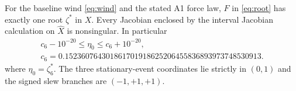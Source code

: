 \begin{theorem}\label{thm:root}
For the baseline wind \eqref{eq:wind} and the stated A1 force law, $F$ in \eqref{eq:root} has exactly one root $\zeta^*$ in $X$. Every Jacobian enclosed by the interval Jacobian calculation on $\widehat X$ is nonsingular. In particular
\begin{equation}\label{eq:etaexact}\begin{gathered}
 c_6-10^{-20}\leq\eta_0\leq c_6+10^{-20},\\
 c_6=0.152360764301861701918625206455836893973748530913.
\end{gathered}\end{equation}
where $\eta_0=\zeta^*_6$. The three stationary-event coordinates lie strictly in $(0,1)$ and the signed slew branches are $(-1,+1,+1)$.
\end{theorem}
